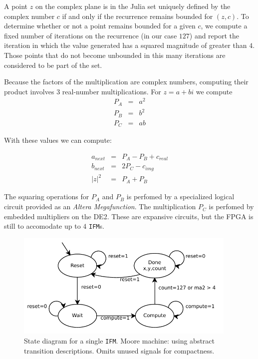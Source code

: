 \documentclass{article}
\begin{document}
A point $z$ on the complex plane is in the Julia set uniquely defined by the complex number $c$ if and only if the 
recurrence remains bounded for $(z, c)$. To determine whether or not a point remains bounded for a given $c$, we compute
a fixed number of iterations on the recurrence (in our case $127$) and report the iteration in which the value generated has
a squared magnitude of greater than $4$. Those points that do not become unbounded in this many iterations are considered
to be part of the set.

Because the factors of the multiplication are complex numbers, computing their product involves
$3$ real-number multiplications. For $z = a + bi$ we compute\\

\begin{eqnarray}
P_A &=& a^2 \nonumber \\
P_B &=& b^2 \nonumber \\
P_C &=& ab \nonumber
\end{eqnarray}

With these values we can compute:

\begin{eqnarray}
a_{next} &=& P_A - P_B + c_{real}\nonumber \\
b_{next} &=& 2P_C - c_{img} \nonumber \\
|z|^2 &=& P_A + P_B \nonumber 
\end{eqnarray}

The squaring operations for $P_A$ and $P_B$ is perfomed by a specialized logical circuit provided as an \textit{Altera Megafunction}. The multiplication $P_C$ is perfomed by embedded multipliers on the DE2. These are expansive circuits, but the FPGA is still to accomodate up to $4$ \texttt{IFM}s.

\begin{figure}[H]
  \centering
    \includegraphics[width=300pt]{state_diagrams/ifm.pdf}
  \caption{State diagram for a single \texttt{IFM}. Moore
    machine: using abstract transition descriptions. Omits unused
    signals for compactness.}
\end{figure}
\end{document}
